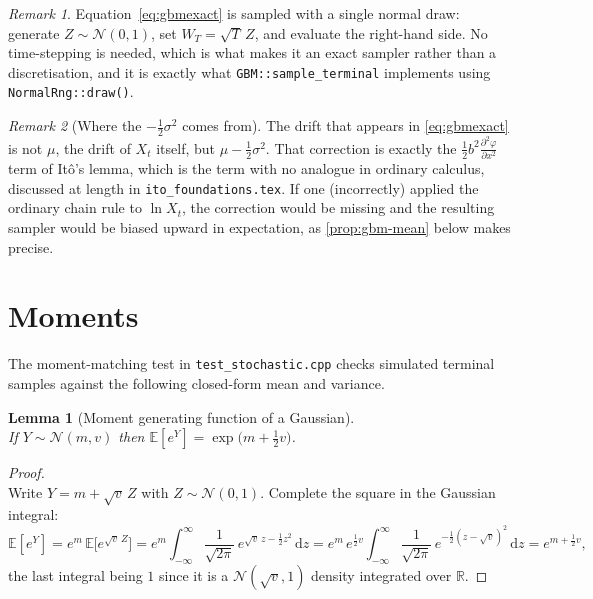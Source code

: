 \documentclass[11pt]{article}
\newcommand{\E}{\mathbb{E}}
\newcommand{\dd}{\mathrm{d}}
\newcommand{\R}{\mathbb{R}}
\newcommand{\diff}{b}
\theoremstyle{plain}
\newtheorem{lemma}{Lemma}
\theoremstyle{definition}
\theoremstyle{remark}
\newtheorem{remark}{Remark}
\begin{document}
\begin{remark}
Equation~\eqref{eq:gbmexact} is sampled with a single normal draw: generate
$Z\sim\mathcal N(0,1)$, set $W_T=\sqrt T\,Z$, and evaluate the
right-hand side. No time-stepping is needed, which is what makes it
an exact sampler rather than a discretisation, and it is exactly
what \texttt{GBM::sample\_terminal} implements using
\texttt{NormalRng::draw()}.
\end{remark}

\begin{remark}[Where the $-\tfrac12\sigma^2$ comes from]
The drift that appears in \eqref{eq:gbmexact} is not $\mu$, the
drift of $X_t$ itself, but $\mu-\tfrac12\sigma^2$. That correction is
exactly the $\tfrac12\diff^2 \frac{\partial^2\varphi}{\partial x^2}$ term of It\^o's lemma, which is the term
with no analogue in ordinary calculus, discussed at length in
\texttt{ito\_foundations.tex}. If one (incorrectly) applied the
ordinary chain rule to $\ln X_t$, the correction would be missing and
the resulting sampler would be biased upward in expectation, as
\cref{prop:gbm-mean} below makes precise.
\end{remark}

\section{Moments}

The moment-matching test in \texttt{test\_stochastic.cpp} checks
simulated terminal samples against the following closed-form mean and
variance.

\begin{lemma}[Moment generating function of a Gaussian]\label{lem:mgf}
\leavevmode\\
If $Y\sim\mathcal N(m,v)$ then $\E[e^Y]=\exp\!\big(m+\tfrac12 v\big)$.
\end{lemma}


\begin{proof}
\leavevmode\\
Write $Y=m+\sqrt v\,Z$ with $Z\sim\mathcal N(0,1)$. Complete the square
in the Gaussian integral:
\[
   \E[e^Y] = e^m\,\E\big[e^{\sqrt v\,Z}\big]
           = e^m \int_{-\infty}^{\infty}
               \frac{1}{\sqrt{2\pi}}\,e^{\sqrt v\,z-\frac12 z^2}\,\dd z
           = e^m\,e^{\frac12 v}
             \int_{-\infty}^{\infty}
               \frac{1}{\sqrt{2\pi}}\,e^{-\frac12(z-\sqrt v)^2}\,\dd z
           = e^{m+\frac12 v},
\]
the last integral being $1$ since it is a $\mathcal N(\sqrt v,1)$
density integrated over $\R$.
\end{proof}
\end{document}
